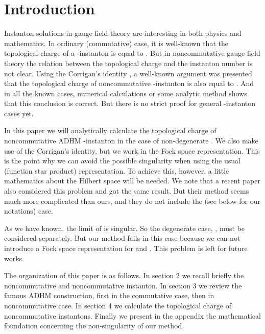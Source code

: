\documentclass[a4paper,a4paper]{article}
\begin{document}
\newpage

\section{Introduction}

Instanton solutions in gauge field theory are interesting in both physics and mathematics. In ordinary (commutative) case, it is well-known that the topological charge of a \coordHE{}  \coordHE{}-instanton is equal to \coordHE{}. But in noncommutative gauge field
theory the relation between the topological charge and the
instanton number is not clear. Using the Corrigan's identity
\cite{Corrigan}, a well-known argument was presented \cite{Paperd}
that the topological charge of noncommutative \coordHE{}  \coordHE{}-instanton
is also equal to \coordHE{}. And in all the known cases, numerical calculations \cite%
{Paperd}\cite{TianZhu} or some analytic method \cite{Calculus} shows that
this conclusion is correct. But there is no strict proof for general \coordHE{}  \coordHE{}-instanton cases yet.

In this paper we will analytically calculate the topological
charge of noncommutative ADHM \coordHE{}  \coordHE{}-instanton in the case of
non-degenerate \myHighlight{$\theta$}\coordHE{}. We also make use of the Corrigan's
identity, but we work in the Fock space representation. This is
the point why we can avoid the possible singularity when using the
usual (function star product) representation. To achieve this,
however, a little mathematics about the Hilbert space will be
needed. We note that a recent paper \cite{charge} also considered
this problem and got the same result. But their method seems much
more complicated than ours, and they do not include the
\coordHE{} (see below for our notations) case.

As we have known, the limit of \coordHE{} is
singular. So the degenerate case, \coordHE{}, must be considered
separately. But our method fails in this case because we can not
introduce a Fock space representation for \coordHE{} and \coordHE{}.
This problem is left for future works.

The organization of this paper is as follows. In section 2 we
recall briefly the noncommutative \coordHE{} and noncommutative
instanton. In section 3 we review the famous ADHM construction,
first in the commutative case, then in noncommutative case. In
section 4 we calculate the topological charge of noncommutative
instantons. Finally we present in the appendix the mathematical
foundation concerning the non-singularity of our method.
\end{document}
